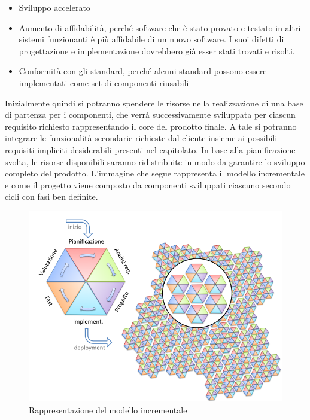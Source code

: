 \begin{itemize}
\begin{itemize}
			\item Sviluppo accelerato
			\item Aumento di affidabilità, perché software che è stato provato e testato in altri sistemi funzionanti è più affidabile di un nuovo software. I suoi difetti di progettazione e implementazione dovrebbero già esser stati trovati e risolti.
			\item Conformità con gli standard, perché alcuni standard
			possono essere implementati come set di componenti riusabili
		\end{itemize}
	\end{itemize}
	Inizialmente quindi si potranno spendere le risorse nella realizzazione di una base di partenza per i componenti, che verrà successivamente sviluppata per ciascun requisito richiesto rappresentando il core del prodotto finale.
	A tale  si potranno integrare le funzionalità secondarie richieste dal cliente insieme ai possibili requisiti impliciti desiderabili presenti nel capitolato. In base alla pianificazione svolta, le risorse disponibili saranno ridistribuite in modo da garantire lo sviluppo completo del prodotto.
	L'immagine che segue rappresenta il modello incrementale e come il progetto viene composto da componenti sviluppati ciascuno secondo cicli con fasi ben definite.
	\begin{figure}[H]
		\centering
		\includegraphics[scale=0.5]{img/modello_incrementale.png}
		\caption{Rappresentazione del modello incrementale \protect\footnotemark}
	\end{figure}

	